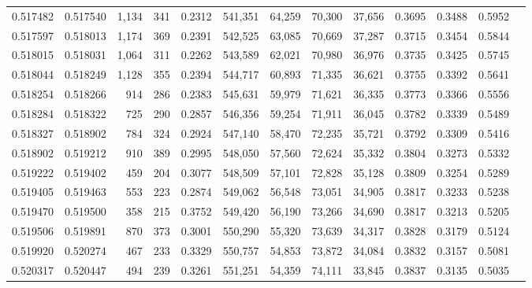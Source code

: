 \begin{tabular}{rrrrrrrrrrrrr}
0.517482 & 0.517540 &  1,134 &   341 &                                     0.2312 & 541,351 &  64,259 &  70,300 &  37,656 & 0.3695 & 0.3488 & 0.5952 \\
0.517597 & 0.518013 &  1,174 &   369 &                                     0.2391 & 542,525 &  63,085 &  70,669 &  37,287 & 0.3715 & 0.3454 & 0.5844 \\
0.518015 & 0.518031 &  1,064 &   311 &                                     0.2262 & 543,589 &  62,021 &  70,980 &  36,976 & 0.3735 & 0.3425 & 0.5745 \\
0.518044 & 0.518249 &  1,128 &   355 &                                     0.2394 & 544,717 &  60,893 &  71,335 &  36,621 & 0.3755 & 0.3392 & 0.5641 \\
0.518254 & 0.518266 &    914 &   286 &                                     0.2383 & 545,631 &  59,979 &  71,621 &  36,335 & 0.3773 & 0.3366 & 0.5556 \\
0.518284 & 0.518322 &    725 &   290 &                                     0.2857 & 546,356 &  59,254 &  71,911 &  36,045 & 0.3782 & 0.3339 & 0.5489 \\
0.518327 & 0.518902 &    784 &   324 &                                     0.2924 & 547,140 &  58,470 &  72,235 &  35,721 & 0.3792 & 0.3309 & 0.5416 \\
0.518902 & 0.519212 &    910 &   389 &                                     0.2995 & 548,050 &  57,560 &  72,624 &  35,332 & 0.3804 & 0.3273 & 0.5332 \\
0.519222 & 0.519402 &    459 &   204 &                                     0.3077 & 548,509 &  57,101 &  72,828 &  35,128 & 0.3809 & 0.3254 & 0.5289 \\
0.519405 & 0.519463 &    553 &   223 &                                     0.2874 & 549,062 &  56,548 &  73,051 &  34,905 & 0.3817 & 0.3233 & 0.5238 \\
0.519470 & 0.519500 &    358 &   215 &                                     0.3752 & 549,420 &  56,190 &  73,266 &  34,690 & 0.3817 & 0.3213 & 0.5205 \\
0.519506 & 0.519891 &    870 &   373 &                                     0.3001 & 550,290 &  55,320 &  73,639 &  34,317 & 0.3828 & 0.3179 & 0.5124 \\
0.519920 & 0.520274 &    467 &   233 &                                     0.3329 & 550,757 &  54,853 &  73,872 &  34,084 & 0.3832 & 0.3157 & 0.5081 \\
0.520317 & 0.520447 &    494 &   239 &                                     0.3261 & 551,251 &  54,359 &  74,111 &  33,845 & 0.3837 & 0.3135 & 0.5035 \\

\end{tabular}
